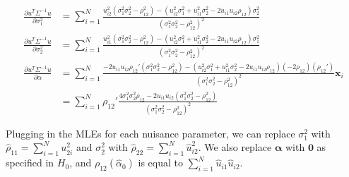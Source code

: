 \documentclass[aap,authoryear, preprint]{imsart}
\numberwithin{equation}{section}
\theoremstyle{plain}
\begin{document}
\begin{align*} \frac{\partial u^T \Sigma^{-1}u}{\partial \sigma_1^2}
&= 
\sum_{i=1}^{N}\frac{
	u_{i2}^2(\sigma_1^2\sigma_2^2 - \rho_{12}^2) - (u_{i2}^2\sigma_1^2 + u_{i1}^2\sigma_2^2 - 2u_{i1}u_{i2}\rho_{12})\sigma_2^2
}{
	(\sigma_1^2\sigma_2^2 - \rho_{12}^2)^2
}\\
  \frac{\partial u^T \Sigma^{-1}u}{\partial \sigma_2^2}
  &= 
\sum_{i=1}^{N} \frac{
 u_{i1}^2(\sigma_1^2\sigma_2^2 - \rho_{12}^2) - (u_{i2}^2\sigma_1^2 + u_{i1}^2\sigma_2^2 - 2u_{i1}u_{i2}\rho_{12})\sigma_1^2
 }{
 (\sigma_1^2\sigma_2^2 - \rho_{12}^2)^2
 }\\
   \frac{\partial u^T \Sigma^{-1}u}{\partial \alpha}
  &= 
 \sum_{i=1}^{N}\frac{-2u_{i1}u_{i2}\rho_{12}'(\sigma_1^2\sigma_2^2 - \rho_{12}^2) - (u_{i2}^2\sigma_1^2 + u_{i1}^2\sigma_2^2 - 2u_{i1}u_{i2}\rho_{12})(-2\rho_{12})(\rho_{12}')
 }{
 (\sigma_1^2\sigma_2^2 - \rho_{12}^2)^2
 }\bm{x}_i\\
 &= \sum_{i=1}^{N} \rho_{12}' \frac{4\sigma_1^2\sigma_2^2\rho_{12} - 2u_{i1}u_{i2}(\sigma_1^2\sigma_2^2 - \rho_{12}^2)}{(\sigma_1^2\sigma_2^2 - \rho_{12}^2)^2}
 \end{align*}
 
 Plugging in the MLEs for each nuisance parameter, we can replace $\sigma_1^2$ with $\hat{\rho}_{11} = \sum_{i=1}^{N} u_{2i}^2$ and $\sigma_2^2$ with $\hat{\rho}_{22} = \sum_{i=1}^{N} \hat{u}_{i2}^2$. We also replace $\bm{\alpha}$ with $\bm{0}$ as specified in $H_0$, and $\rho_{12}(\hat{\alpha}_0)$ is equal to $\sum_{i=1}^{N} \hat{u}_{i1}\hat{u}_{i2}$. 
\end{document}
